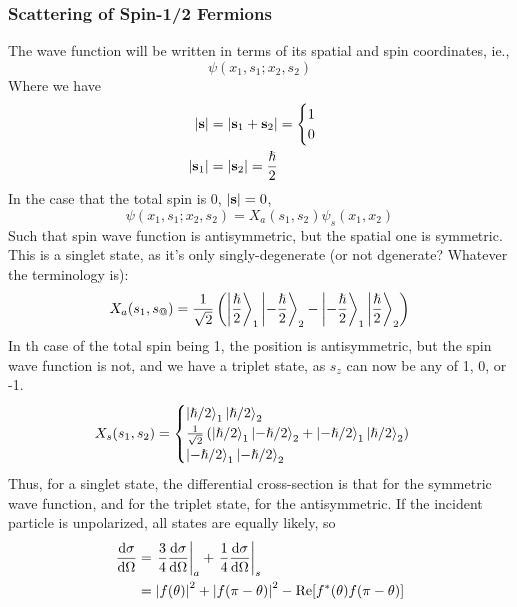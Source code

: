 \documentclass[a4paper]{article}
\begin{document}
\subsubsection{Scattering of Spin-1/2 Fermions}
The wave function will be written in terms of its spatial and spin coordinates,
ie.,
\[
	\psi(x_1,s_1;x_2,s_2)
\]
Where we have
\begin{align*}
	\left\lvert \boldsymbol{\mathbf{s}}\right\rvert &=  \left\lvert \boldsymbol{\mathbf{s}}_1+ \boldsymbol{\mathbf{s}}_2\right\rvert = \begin{cases}
	1\\0 \end{cases}\\
	\left\lvert \boldsymbol{\mathbf{s}}_1\right\rvert &= \left\lvert \boldsymbol{\mathbf{s}}_2\right\rvert = \frac{\hslash}{2}
\end{align*}
In the case that the total spin is 0, $\left\lvert \boldsymbol{\mathbf{s}}\right\rvert = 0$,
\[
	\psi(x_1,s_1;x_2,s_2) = X_a(s_1,s_2)\psi_s(x_1,x_2)
\]
Such that spin wave function is antisymmetric, but the spatial one is
symmetric. This is a singlet state, as it's only singly-degenerate (or not
dgenerate? Whatever the terminology is):
\[
	X_a(s_1,s_@) = \frac{1}{\sqrt{2}} \left(\left\lvert \frac{\hslash}{2}\right\rangle_1
		\left\lvert -\frac{\hslash}{2}\right\rangle_2 - \left\lvert -\frac{\hslash}{2}\right\rangle_1
	\left\lvert \frac{\hslash}{2}\right\rangle_2\right)
\]
In th case of the total spin being 1, the position is antisymmetric, but the
spin wave function is not, and we have a triplet state, as $s_z$ can now be any
of 1, 0, or -1.
\[
	X_s(s_1,s_2) = \begin{cases}
		\left\lvert \hslash/2\right\rangle_1\left\lvert \hslash/2\right\rangle_2\\
		\frac{1}{\sqrt{2}} \left(\left\lvert \hslash/2\right\rangle_1
		\left\lvert -\hslash/2\right\rangle_2 + \left\lvert -\hslash/2\right\rangle_1
		\left\lvert \hslash/2\right\rangle_2\right)\\
		\left\lvert -\hslash/2\right\rangle_1\left\lvert -\hslash/2\right\rangle_2
	\end{cases}
\]
Thus, for a singlet state, the differential cross-section is that for the
symmetric wave function, and for the triplet state, for the antisymmetric. If
the incident particle is unpolarized, all states are equally likely, so
\begin{align*}
	\frac{\mathrm{d} \sigma}{\mathrm{d} \Omega} &= \left.\frac{3}{4}\frac{\mathrm{d} \sigma}{\mathrm{d} \Omega}\right|_{a}
		+ \left.\frac{1}{4}\frac{\mathrm{d} \sigma}{\mathrm{d} \Omega}\right|_s\\
	&= \left\lvert f(\theta)\right\rvert^2 + \left\lvert f(\pi-\theta)\right\rvert^2 -
	\textrm{Re}[f^\ast(\theta)f(\pi-\theta)]
\end{align*}
\end{document}
